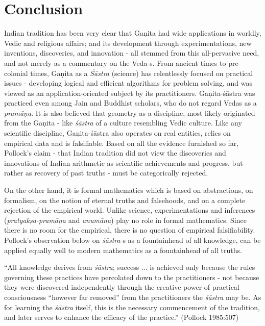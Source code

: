 \medskip

\section*{Conclusion}

Indian tradition has been very clear that Gaṇita had wide applications in worldly, Vedic and religious affairs; and its development through experimentations, new inventions, discoveries, and innovation - all stemmed from this all-pervasive need, and not merely as a commentary on the Veda-s. From ancient times to pre-colonial times, Gaṇita as a {\sl Śāstra} (science) has relentlessly focused on practical issues - developing logical and efficient algorithms for problem solving, and was viewed as an application-oriented subject by its practitioners. Gaṇita-śāstra was practiced even among Jain and Buddhist scholars, who do not regard Vedas as a {\sl pramāṇa}. It is also believed that geometry as a discipline, most likely originated from the Gaṇita - like {\sl śāstra} of a culture resembling Vedic culture. Like any scientific discipline, Gaṇita-śāstra also operates on real entities, relies on empirical data and is falsifiable. Based on all the evidence furnished so far, Pollock’s claim - that Indian tradition did not view the discoveries and innovations of Indian arithmetic as scientific achievements and progress, but rather as recovery of past truths - must be categorically rejected.

On the other hand, it is formal mathematics which is based on abstractions, on formalism, on the notion of eternal truths and falsehoods, and on a complete rejection of the empirical world. Unlike science, experimentations and inferences ({\sl pratyakṣa-pramāṇa} and {\sl anumāna}) play no role in formal mathematics. Since there is no room for the empirical, there is no question of empirical falsifiability. Pollock’s observation below on {\sl śāstra}-s as a fountainhead of all knowledge, can be applied equally well to modern mathematics as a fountainhead of all truths.
\begin{myquote}
``All knowledge derives from {\sl śāstra}; success ... is achieved only because the rules governing these practices have percolated down to the practitioners - not because they were discovered independently through the creative power of practical consciousness ``however far removed'' from the practitioners the {\sl śāstra} may be. As for learning the {\sl śāstra} itself, this is the necessary commencement of the tradition, and later serves to enhance the efficacy of the practice.'' (Pollock 1985:507)
\end{myquote}

